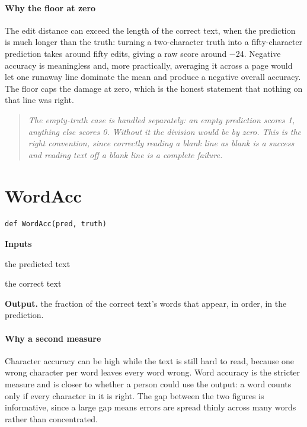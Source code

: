 \paragraph{Why the floor at zero}
The edit distance can exceed the length of the correct text, when the prediction is much longer than the truth: turning a two-character truth into a fifty-character prediction takes around fifty edits, giving a raw score around $-$24. Negative accuracy is meaningless and, more practically, averaging it across a page would let one runaway line dominate the mean and produce a negative overall accuracy. The floor caps the damage at zero, which is the honest statement that nothing on that line was right.


\begin{quote}\small\itshape The empty-truth case is handled separately: an empty prediction scores 1, anything else scores 0. Without it the division would be by zero. This is the right convention, since correctly reading a blank line as blank is a success and reading text off a blank line is a complete failure.\end{quote}

\section{WordAcc}
\begin{lstlisting}[style=sig]
def WordAcc(pred, truth)
\end{lstlisting}

\noindent\textbf{Inputs}
\begin{description}[leftmargin=2.2em,style=nextline,font=\normalfont\ttfamily]\setlength\itemsep{1pt}
  \item[{pred}] \normalfont the predicted text
  \item[{truth}] \normalfont the correct text
\end{description}

\noindent\textbf{Output.} the fraction of the correct text's words that appear, in order, in the prediction.


\paragraph{Why a second measure}
Character accuracy can be high while the text is still hard to read, because one wrong character per word leaves every word wrong. Word accuracy is the stricter measure and is closer to whether a person could use the output: a word counts only if every character in it is right. The gap between the two figures is informative, since a large gap means errors are spread thinly across many words rather than concentrated.



